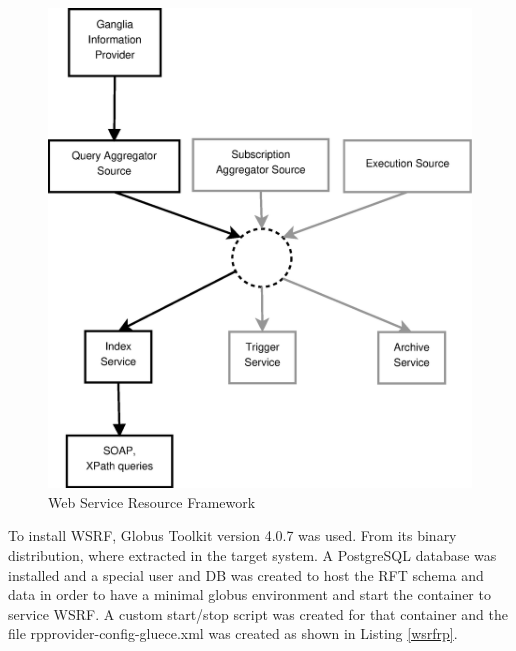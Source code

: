 \begin{figure}[htb]
\centering
 \includegraphics[width=120mm]{images/wsrf.eps}
\caption{Web Service Resource Framework}
\label{figure:wsrf}
\end{figure}

To install WSRF, Globus Toolkit version 4.0.7 was used. From its binary distribution, where extracted in the target system. A PostgreSQL database was installed and a special user and DB was created to host the RFT schema and data in order to have a minimal globus environment and start the container to service WSRF. A custom start/stop script was created for that container and the file rpprovider-config-gluece.xml was created as shown in Listing \ref{wsrfrp}.

